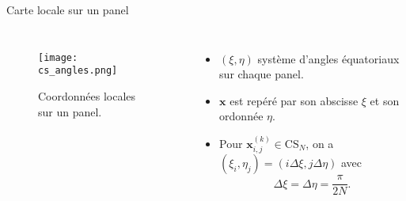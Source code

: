 \documentclass[11pt]{beamer}
\def\CS{\text{CS}}
\begin{document}
\begin{frame}{Carte locale sur un panel}
\begin{columns}
\begin{figure}[htbp]
\begin{center}
\texttt{[image: cs\_angles.png]}
\end{center}
\caption{Coordonnées locales sur un panel.}
\end{figure}
\begin{itemize}
\item $(\xi, \eta)$ système d'angles équatoriaux sur chaque panel.
\item $\mathbf{x}$ est repéré par son abscisse $\xi$ et son ordonnée $\eta$.
\item Pour $\mathbf{x}_{i,j}^{(k)} \in \CS_N$, on a $(\xi_i, \eta_j) = (i \Delta \xi, j \Delta \eta)$ avec 
$$
\Delta \xi = \Delta \eta = \dfrac{\pi}{2N}.
$$
\end{itemize}
\end{columns}
\end{frame}
\end{document}
